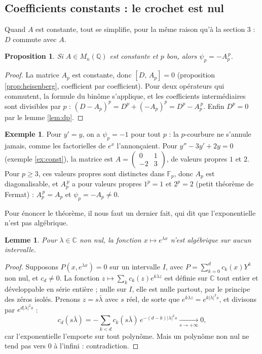 \documentclass[11pt,a4paper]{article}
\theoremstyle{plain}
\newtheorem{proposition}[theoreme]{Proposition}
\newtheorem{lemme}[theoreme]{Lemme}
\theoremstyle{definition}
\newtheorem{exemple}[theoreme]{Exemple}
\theoremstyle{remark}
\newcommand{\Q}{\mathbb{Q}}
\newcommand{\C}{\mathbb{C}}
\newcommand{\F}{\mathbb{F}}
\newcommand{\Dx}{D}
\newcommand{\cro}[2]{\left[#1,\,#2\right]}
\begin{document}
\subsection{Coefficients constants : le crochet est nul}

Quand $A$ est constante, tout se simplifie, pour la même raison qu'à la section 3 : $\Dx$ commute avec $A$.

\begin{proposition}\label{prop:psiconst}
Si $A \in M_n(\Q)$ est constante et $p$ bon, alors $\psi_p = -A_p^{\,p}$.
\end{proposition}

\begin{proof}
La matrice $A_p$ est constante, donc $\cro{\Dx}{A_p} = 0$ (proposition \ref{prop:heisenberg}, coefficient par coefficient). Pour deux opérateurs qui commutent, la formule du binôme s'applique, et les coefficients intermédiaires sont divisibles par $p$ : $(\Dx - A_p)^p = \Dx^p + (-A_p)^p = \Dx^p - A_p^{\,p}$. Enfin $\Dx^p = 0$ par le lemme \ref{lem:dp}.
\end{proof}

\begin{exemple}
Pour $y' = y$, on a $\psi_p = -1$ pour tout $p$ : la $p$-courbure ne s'annule jamais, comme les factorielles de $e^x$ l'annonçaient. Pour $y'' - 3y' + 2y = 0$ (exemple \ref{ex:const}), la matrice est $A = \begin{pmatrix} 0 & 1 \\ -2 & 3 \end{pmatrix}$, de valeurs propres $1$ et $2$. Pour $p \geq 3$, ces valeurs propres sont distinctes dans $\F_p$, donc $A_p$ est diagonalisable, et $A_p^{\,p}$ a pour valeurs propres $1^p = 1$ et $2^p = 2$ (petit théorème de Fermat) : $A_p^{\,p} = A_p$ et $\psi_p = -A_p \neq 0$.
\end{exemple}

Pour énoncer le théorème, il nous faut un dernier fait, qui dit que l'exponentielle n'est pas algébrique.

\begin{lemme}\label{lem:expalg}
Pour $\lambda \in \C$ non nul, la fonction $x \mapsto e^{\lambda x}$ n'est algébrique sur aucun intervalle.
\end{lemme}

\begin{proof}
Supposons $P(x, e^{\lambda x}) = 0$ sur un intervalle $I$, avec $P = \sum_{k=0}^d c_k(x) Y^k$ non nul, et $c_d \neq 0$. La fonction $z \mapsto \sum_k c_k(z) e^{k\lambda z}$ est définie sur $\C$ tout entier et développable en série entière ; nulle sur $I$, elle est nulle partout, par le principe des zéros isolés. Prenons $z = s\bar\lambda$ avec $s$ réel, de sorte que $e^{k\lambda z} = e^{k|\lambda|^2 s}$, et divisons par $e^{d|\lambda|^2 s}$ :
\[
  c_d(s\bar\lambda) = -\sum_{k<d} c_k(s\bar\lambda)\, e^{-(d-k)|\lambda|^2 s} \xrightarrow[s \to +\infty]{} 0 ,
\]
car l'exponentielle l'emporte sur tout polynôme. Mais un polynôme non nul ne tend pas vers $0$ à l'infini : contradiction.
\end{proof}
\end{document}
